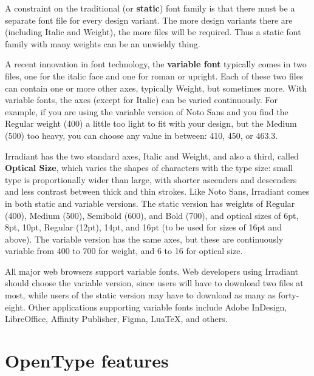 \documentclass[12pt]{book}
\begin{document}
A constraint on the traditional (or \textbf{static}) font family is that there must be a separate
font file for every design variant. The more design variants there are
(including Italic and Weight), the more files will be required. Thus a static font family with many 
weights can be an unwieldy thing.

A recent innovation in font technology, the \textbf{variable font} typically comes in two files,
one for the italic face and one for roman or upright. Each of these two files can contain 
one or more other axes, typically Weight, but sometimes more. With variable fonts,
the axes (except for Italic) can be varied continuously. For example, if you are using the
variable version of Noto Sans and you find the Regular weight (400) a little too light to fit
with your design, but the 
Medium (500) too heavy, you can choose any value in between: 410, 450, or 463.3.

Irradiant has the two standard axes, Italic and Weight, and also a third, called \textbf{Optical Size},
which varies the shapes of characters with the type size: small type is proportionally wider than 
large, with shorter ascenders and descenders and less contrast between thick and thin strokes.
Like Noto Sans, Irradiant comes in both static and variable versions. The static version has
weights of Regular (400), Medium (500), Semibold (600), and Bold (700), and optical sizes of
6pt, 8pt, 10pt, Regular (12pt), 14pt, and 16pt (to be used for sizes of 16pt and above).
The variable version has the same axes, but these are continuously variable from 400 to 700 for
weight, and 6 to 16 for optical size.

All major web browsers support variable fonts. Web developers using Irradiant should choose the
variable version, since users will have to download two files at most, while users of the static
version may have to download as many as forty-eight. Other applications supporting variable 
fonts include Adobe InDesign, LibreOffice, Affinity Publisher, Figma, LuaTeX, and others.%
\pagebreak




\section*{OpenType features}
\end{document}
